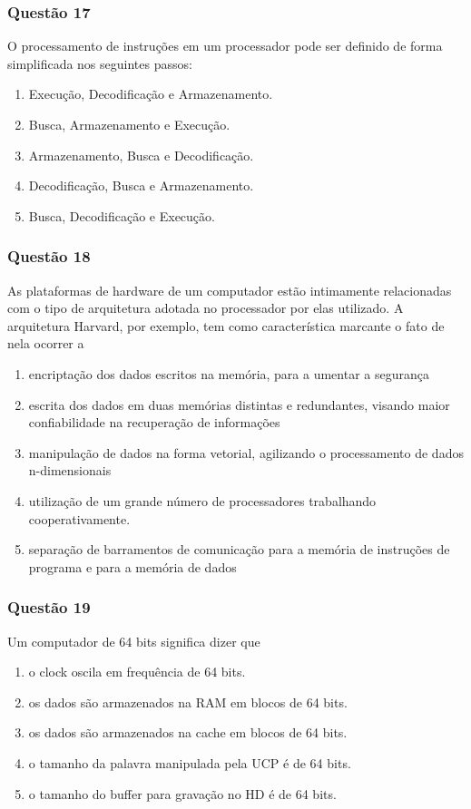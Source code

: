 \documentclass[	aspectratio=169,
				xcolor=table]{beamer}
\begin{document}
	\begin{frame}
		\frametitle{Questão 17}
		O processamento de instruções em um processador pode ser definido de forma simplificada nos seguintes passos: 
		\begin{enumerate}[a]
			\item Execução, Decodificação e Armazenamento. 
			\item Busca, Armazenamento e Execução. 
			\item Armazenamento, Busca e Decodificação.
			\item Decodificação, Busca e Armazenamento. 
			\item Busca, Decodificação e Execução.			
		\end{enumerate}
	\end{frame}
	
	\begin{frame}
		\frametitle{Questão 18}
		As plataformas de hardware de um computador estão intimamente relacionadas com o tipo de arquitetura adotada no processador por elas utilizado. A arquitetura Harvard, por exemplo, tem como característica marcante o fato de nela ocorrer a
		\begin{enumerate}[a]
			\large
			\item encriptação dos dados escritos na memória, para a umentar a segurança
			\item escrita dos dados em duas memórias distintas e redundantes, visando maior confiabilidade na recuperação de informações
			\item manipulação de dados na forma vetorial, agilizando o processamento de dados n-dimensionais
			\item utilização de um grande número de processadores trabalhando cooperativamente.
			\item separação de barramentos de comunicação para a memória de instruções de programa e para a memória de dados			
		\end{enumerate}
	\end{frame}
	
	\begin{frame}
		\frametitle{Questão 19}
		Um computador de 64 bits significa dizer que
		
		\begin{enumerate}[a]
			\item o clock oscila em frequência de 64 bits.
			\item os dados são armazenados na RAM em blocos de 64 bits.
			\item os dados são armazenados na cache em blocos de 64 bits.
			\item o tamanho da palavra manipulada pela UCP é de 64 bits.
			\item o tamanho do buffer para gravação no HD é de 64 bits.			
		\end{enumerate}


	\end{frame}
\end{document}
